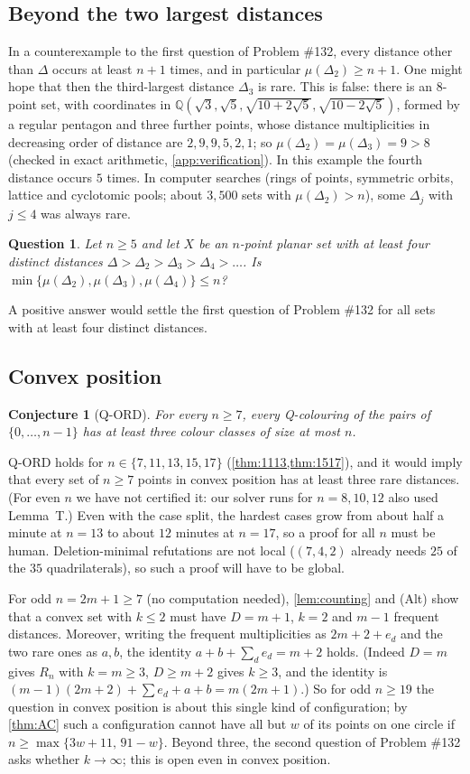 \documentclass[11pt]{amsart}
\newtheorem{conjecture}[theorem]{Conjecture}
\newtheorem{question}[theorem]{Question}
\theoremstyle{definition}
\theoremstyle{remark}
\newcommand{\Dt}{\Delta_2}
\newcommand{\mult}{\mu}
\begin{document}
\subsection*{Beyond the two largest distances}
In a counterexample to the first question of Problem \#132, every distance other than $\Delta$ occurs at least $n+1$ times, and in particular $\mult(\Dt)\ge n+1$. One might hope that then the third-largest distance $\Delta_3$ is rare. This is false: there is an $8$-point set, with coordinates in $\mathbb Q(\sqrt3,\sqrt5,\sqrt{10+2\sqrt5},\sqrt{10-2\sqrt5})$, formed by a regular pentagon and three further points, whose distance multiplicities in decreasing order of distance are $2,9,9,5,2,1$; so $\mult(\Dt)=\mult(\Delta_3)=9>8$ (checked in exact arithmetic, \cref{app:verification}). In this example the fourth distance occurs $5$ times. In computer searches (rings of points, symmetric orbits, lattice and cyclotomic pools; about $3{,}500$ sets with $\mult(\Dt)>n$), some $\Delta_j$ with $j\le4$ was always rare.
\begin{question}\label{q:top3}
Let $n\ge5$ and let $X$ be an $n$-point planar set with at least four distinct distances $\Delta>\Dt>\Delta_3>\Delta_4>\dots$. Is $\min\{\mult(\Dt),\mult(\Delta_3),\mult(\Delta_4)\}\le n$?
\end{question}
A positive answer would settle the first question of Problem \#132 for all sets with at least four distinct distances.

\subsection*{Convex position}
\begin{conjecture}[Q-ORD]\label{conj:QORD}
For every $n\ge7$, every Q-colouring of the pairs of $\{0,\dots,n-1\}$ has at least three colour classes of size at most $n$.
\end{conjecture}
Q-ORD holds for $n\in\{7,11,13,15,17\}$ (\cref{thm:1113,thm:1517}), and it would imply that every set of $n\ge7$ points in convex position has at least three rare distances. (For even $n$ we have not certified it: our solver runs for $n=8,10,12$ also used Lemma~T.) Even with the case split, the hardest cases grow from about half a minute at $n=13$ to about $12$ minutes at $n=17$, so a proof for all $n$ must be human. Deletion-minimal refutations are not local ($(7,4,2)$ already needs $25$ of the $35$ quadrilaterals), so such a proof will have to be global.

For odd $n=2m+1\ge7$ (no computation needed), \cref{lem:counting} and (Alt) show that a convex set with $k\le2$ must have $D=m+1$, $k=2$ and $m-1$ frequent distances. Moreover, writing the frequent multiplicities as $2m+2+e_d$ and the two rare ones as $a,b$, the identity $a+b+\sum_de_d=m+2$ holds. (Indeed $D=m$ gives $R_n$ with $k=m\ge3$, $D\ge m+2$ gives $k\ge3$, and the identity is $(m-1)(2m+2)+\sum e_d+a+b=m(2m+1)$.) So for odd $n\ge19$ the question in convex position is about this single kind of configuration; by \cref{thm:AC} such a configuration cannot have all but $w$ of its points on one circle if $n\ge\max\{3w+11,\,91-w\}$. Beyond three, the second question of Problem \#132 asks whether $k\to\infty$; this is open even in convex position.
\end{document}
